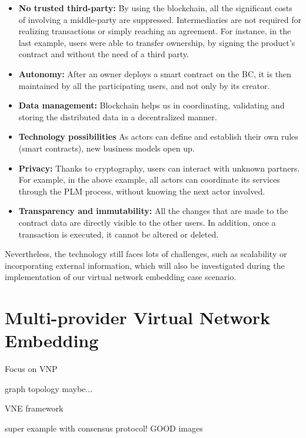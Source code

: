 \begin{itemize}
	\item \textbf{No trusted third-party:} By using the blockchain, all the significant costs of involving a middle-party are suppressed\citep{mainelli2015sharing}. Intermediaries are not required for realizing transactions or simply reaching an agreement. For instance, in the last example, users were able to transfer ownership, by signing the product's contract and without the need of a third party.
	\item \textbf{Autonomy:} After an owner deploys a smart contract on the BC, it is then maintained by all the participating users, and not only by its creator.
	\item \textbf{Data management:} Blockchain helps us in coordinating, validating and storing the distributed data in a decentralized manner.
	\item \textbf{Technology possibilities} As actors can define and establish their own rules (smart contracts), new business models open up.
	\item \textbf{Privacy:} Thanks to cryptography, users can interact with unknown partners. For example, in the above example, all actors can coordinate its services through the PLM process, without knowing the next actor involved. 
    \item \textbf{Transparency and immutability:} All the changes that are made to the contract data are directly visible to the other users. In addition, once a transaction is executed, it cannot be altered or deleted.
	
\end{itemize}

Nevertheless, the technology still faces lots of challenges, such as scalability or incorporating external information, which will also be investigated during the implementation of our virtual network embedding case scenario.

\section{Multi-provider Virtual Network Embedding}


Focus on VNP \citep{dietrich2015multi}

\citep{dietrich2017multi} graph topology maybe...

\citep{zaheer2010multi} VNE framework

\citep{esposito2013general} super example with consensus protocol! GOOD images

